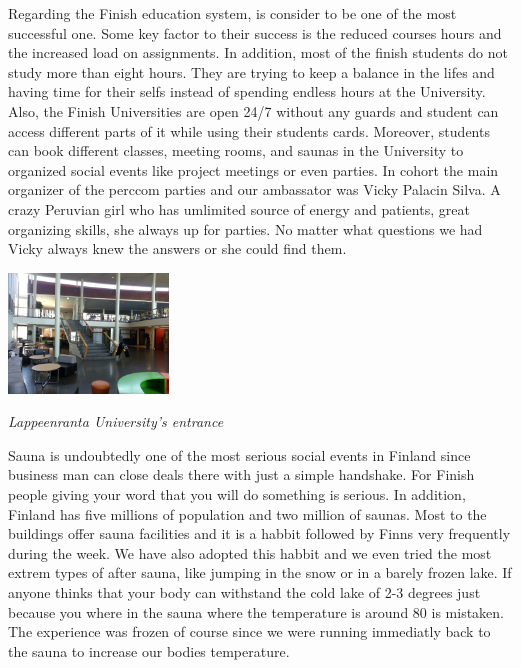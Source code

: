 \documentclass[10pt,a4paper]{article} %
\begin{document}
\begin{multicols}{3}
Regarding the Finish education system, is consider to be one of the most successful 
one. 
Some key factor to their success is the reduced courses hours and the increased 
load on assignments. 
In addition, most of the finish students do not study more than eight hours. 
They are trying to keep a balance in the lifes and having time for their selfs 
instead of spending endless hours at the University. 
Also, the Finish Universities are open 24/7 without any guards and student can 
access different parts of it while using their students cards. 
Moreover, students can book different classes, meeting rooms, and saunas 
in the University to organized social events like project meetings or even parties. 
In cohort the main organizer of the {\sc perccom} parties and our ambassator was 
Vicky Palacin Silva. 
A crazy Peruvian girl who has umlimited source of energy and patients, great 
organizing skills, she always up for parties. 
No matter what questions we had Vicky always knew the answers or she could 
find them. 



\begin{center}
	\includegraphics[width=0.32\textwidth]{media/entrance_university.jpg}
	\par\textit{Lappeenranta University's entrance}
\end{center}



Sauna is undoubtedly one of the most serious social events in Finland since business 
man can close deals there with just a simple handshake. 
For Finish people giving your word that you will do something is serious. 
In addition, Finland has five millions of population and two million of saunas. 
Most to the buildings offer sauna facilities and it is a habbit followed by Finns 
very frequently during the week. 
We have also adopted this habbit and we even tried the most extrem types of after 
sauna, like jumping in the snow or in a barely frozen lake. 
If anyone thinks that your body can withstand the cold lake of 2-3 degrees just 
because you where in the sauna where the temperature is around 80 is mistaken. 
The experience was frozen of course since we were running immediatly back to the 
sauna to increase our bodies temperature.  



\end{multicols}
\end{document}
